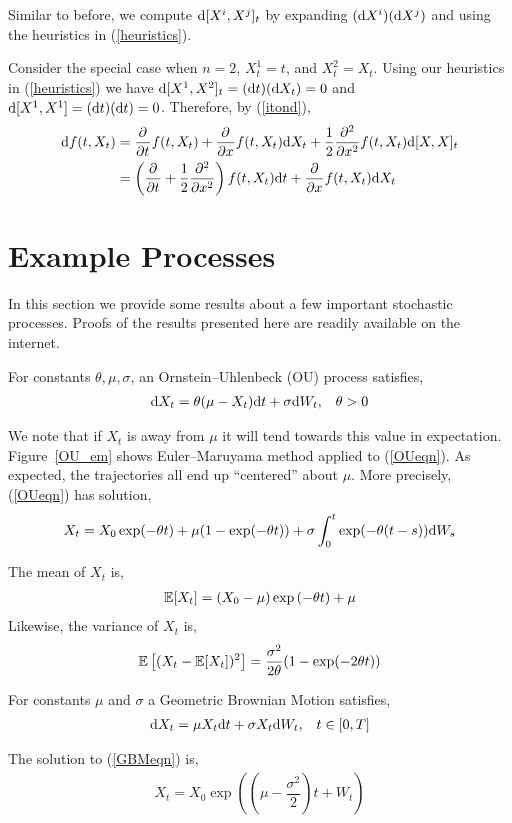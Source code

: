 \documentclass[11pt]{article}
\begin{document}
Similar to before, we compute \( \d[X^i,X^j]_t \) by expanding \( (\d X^i)(\d X^j) \) and using the heuristics in (\ref{heuristics}).

Consider the special case when \( n=2 \), \( X_t^1 = t\), and \( X_t^2 = X_t \). Using our heuristics in (\ref{heuristics}) we have \( \d[X^1,X^2]_t = (\d t)(\d X_t) = 0 \) and \( \d[X^1,X^1] = (\d t)(\d t) = 0 \). Therefore, by (\ref{itond}),
\begin{align}
    \d f(t,X_t) &= \pp{}{t} f(t,X_t) + \pp{}{x} f(t,X_t) \d X_t + \dfrac{1}{2} \pp[2]{}{x}f(t,X_t) \d [X,X]_t
    \\ &= \left( \pp{}{t} + \dfrac{1}{2}\pp[2]{}{x} \right)f(t,X_t)\d t + \pp{}{x} f(t,X_t) \d X_t \label{2dito}
\end{align}

\section{Example Processes}
In this section we provide some results about a few important stochastic processes. Proofs of the results presented here are readily available on the internet.

For constants \( \theta, \mu, \sigma \), an Ornstein--Uhlenbeck (OU) process satisfies,
\begin{align}
    \d X_t = \theta(\mu-X_t) \d t + \sigma \d W_t, && \theta > 0 \label{OUeqn}
\end{align}

We note that if \( X_t \) is away from \( \mu \) it will tend towards this value in expectation. Figure~\ref{OU_em} shows Euler--Maruyama method applied to (\ref{OUeqn}). As expected, the trajectories all end up ``centered'' about \( \mu \). More precisely, (\ref{OUeqn}) has solution,
\begin{align*}
    X_t = X_0 \exp(-\theta t) + \mu(1-\exp(-\theta t)) + \sigma \int_0^t \exp(-\theta(t-s))\d W_s
\end{align*}

The mean of \( X_t \) is,
\begin{align*}
    \bE[X_t] = (X_0 - \mu)\exp \left( -\theta t \right)+ \mu
\end{align*}
Likewise, the variance of \( X_t \) is,
\begin{align*}
    \bE\left[(X_t-\bE[X_t])^2\right] = \dfrac{\sigma^2}{2\theta}(1-\exp(-2\theta t))
\end{align*}


For constants \( \mu \) and \( \sigma \) a Geometric Brownian Motion satisfies,
\begin{align}
    \d X_t = \mu X_t \d t + \sigma X_t \d W_t, && t\in[0,T] \label{GBMeqn}
\end{align}

The solution to (\ref{GBMeqn}) is,
\begin{align*}
    X_t = X_0 \exp\left( \left( \mu - \dfrac{\sigma^2}{2} \right)t + W_t \right)
\end{align*}

{}

\end{document}
